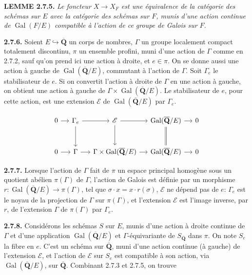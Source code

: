 \documentclass[10pt,a4paper]{article}
\begin{document}
\textbf{LEMME 2.7.5.} \emph{Le foncteur \(X\to X_F\) est une équivalence de la catégorie des schémas sur \(E\) avec la catégorie des schémas sur \(F\), munis d'une action continue de \(\operatorname{Gal}(F/E)\) compatible à l'action de ce groupe de Galois sur \(F\).}

\textbf{2.7.6.} Soient \(E\hookrightarrow\overline{\mathbf Q}\) un corps de nombres, \(\Gamma\) un groupe localement compact totalement discontinu, \(\pi\) un ensemble profini, muni d'une action de \(\Gamma\) comme en 2.7.2, sauf qu'on prend ici une action à droite, et \(e\in\pi\). On se donne aussi une action à gauche de \(\operatorname{Gal}(\overline{\mathbf Q}/E)\), commutant à l'action de \(\Gamma\). Soit \(\Gamma_e\) le stabilisateur de \(e\). Si on convertit l'action à droite de \(\Gamma\) en une action à gauche, on obtient une action à gauche de \(\Gamma\times\operatorname{Gal}(\overline{\mathbf Q}/E)\). Le stabilisateur de \(e\), pour cette action, est une extension \(\mathscr E\) de \(\operatorname{Gal}(\overline{\mathbf Q}/E)\) par \(\Gamma_e\).

\[
\begin{tikzcd}[column sep=small,row sep=large]
0 \arrow[r] & \Gamma_e \arrow[r] \arrow[d] & \mathscr E \arrow[r] \arrow[d] & \operatorname{Gal}(\overline{\mathbf Q}/E) \arrow[r] \arrow[d,equal] & 0 \\
0 \arrow[r] & \Gamma \arrow[r] & \Gamma\times\operatorname{Gal}(\overline{\mathbf Q}/E) \arrow[r] & \operatorname{Gal}(\overline{\mathbf Q}/E) \arrow[r] & 0
\end{tikzcd}
\]

\textbf{2.7.7.} Lorsque l'action de \(\Gamma\) fait de \(\pi\) un espace principal homogène sous un quotient abélien \(\pi(\Gamma)\) de \(\Gamma\), l'action de Galois est définie par un morphisme \(r:\operatorname{Gal}(\overline{\mathbf Q}/E)\to\pi(\Gamma)\), tel que \(\sigma\cdot x=x\cdot r(\sigma)\), \(\mathscr E\) ne dépend pas de \(e\): \(\Gamma_e\) est le noyau de la projection de \(\Gamma\) sur \(\pi(\Gamma)\), et l'extension \(\mathscr E\) est l'image inverse, par \(r\), de l'extension \(\Gamma\) de \(\pi(\Gamma)\) par \(\Gamma_e\).

\textbf{2.7.8.} Considérons les schémas \(S\) sur \(E\), munis d'une action à droite continue de \(\Gamma\) et d'une application \(\operatorname{Gal}(\overline{\mathbf Q}/E)\) et \(\Gamma\)-équivariante de \(S_{\overline{\mathbf Q}}\) dans \(\pi\). On note \(S_e\) la fibre en \(e\). C'est un schéma sur \(\overline{\mathbf Q}\), muni d'une action continue (à gauche) de l'extension \(\mathscr E\), et l'action de \(\mathscr E\) sur \(S_e\) est compatible à son action, via \(\operatorname{Gal}(\overline{\mathbf Q}/E)\), sur \(\overline{\mathbf Q}\). Combinant 2.7.3 et 2.7.5, on trouve
\end{document}

